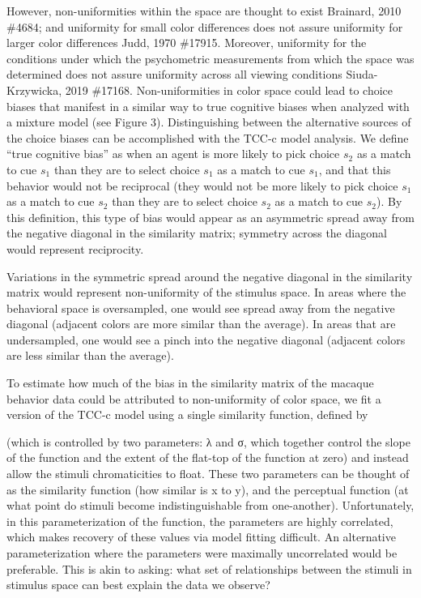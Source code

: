 However, non-uniformities within the space are thought to exist {Brainard, 2010 \#4684}; and uniformity for small color differences does not assure uniformity for larger color differences {Judd, 1970 \#17915}. Moreover, uniformity for the conditions under which the psychometric measurements from which the space was determined does not assure uniformity across all viewing conditions {Siuda-Krzywicka, 2019 \#17168}. Non-uniformities in color space could lead to choice biases that manifest in a similar way to true cognitive biases when analyzed with a mixture model (see Figure 3). Distinguishing between the alternative sources of the choice biases can be accomplished with the TCC-c model analysis. We define “true cognitive bias” as when an agent is more likely to pick choice $s_2$ as a match to cue $s_1$ than they are to select choice $s_1$ as a match to cue $s_1$, and that this behavior would not be reciprocal (they would not be more likely to pick choice $s_1$ as a match to cue $s_2$ than they are to select choice $s_2$ as a match to cue $s_2$). By this definition, this type of bias would appear as an asymmetric spread away from the negative diagonal in the similarity matrix; symmetry across the diagonal would represent reciprocity. 

Variations in the symmetric spread around the negative diagonal in the similarity matrix would represent non-uniformity of the stimulus space. In areas where the behavioral space is oversampled, one would see spread away from the negative diagonal (adjacent colors are more similar than the average). In areas that are undersampled, one would see a pinch into the negative diagonal (adjacent colors are less similar than the average). 

To estimate how much of the bias in the similarity matrix of the macaque behavior data could be attributed to non-uniformity of color space, we fit a version of the TCC-c model using a single similarity function, defined by 

(which is controlled by two parameters: λ and σ, which together control the slope of the function and the extent of the flat-top of the function at zero) and instead allow the stimuli chromaticities to float. These two parameters can be thought of as the similarity function (how similar is x to y), and the perceptual function (at what point do stimuli become indistinguishable from one-another). Unfortunately, in this parameterization of the function, the parameters are highly correlated, which makes recovery of these values via model fitting difficult. An alternative parameterization where the parameters were maximally uncorrelated would be preferable. This is akin to asking: what set of relationships between the stimuli in stimulus space can best explain the data we observe?


